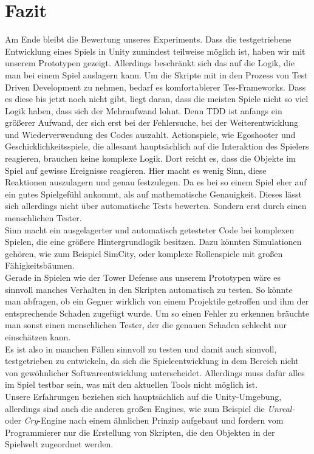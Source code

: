 \chapter{Fazit}
Am Ende bleibt die Bewertung unseres Experiments. Dass die testgetriebene Entwicklung eines Spiels in Unity zumindest teilweise möglich ist, haben wir mit unserem Prototypen gezeigt. Allerdings beschränkt sich das auf die Logik, die man bei einem Spiel auslagern kann. Um die Skripte mit in den Prozess von Test Driven Development zu nehmen, bedarf es komfortablerer Tes-Frameworks. Dass es diese bis jetzt noch nicht gibt, liegt daran, dass die meisten Spiele nicht so viel Logik haben, dass sich der Mehraufwand lohnt. Denn TDD ist anfangs ein größerer Aufwand, der sich erst bei der Fehlersuche, bei der Weiterentwicklung und Wiederverwendung des Codes auszahlt. Actionspiele, wie Egoshooter und Geschicklichkeitsspiele, die allesamt hauptsächlich auf die Interaktion des Spielers reagieren, brauchen keine komplexe Logik. Dort reicht es, dass die Objekte im Spiel auf gewisse Ereignisse reagieren. Hier macht es wenig Sinn, diese Reaktionen auszulagern und genau festzulegen. Da es bei so einem Spiel eher auf ein gutes Spielgefühl ankommt, als auf mathematische Genauigkeit. Dieses lässt sich allerdings nicht über automatische Tests bewerten. Sondern erst durch einen menschlichen Tester.\\
Sinn macht ein ausgelagerter und automatisch getesteter Code bei komplexen Spielen, die eine größere Hintergrundlogik besitzen. Dazu könnten Simulationen gehören, wie zum Beispiel SimCity, oder komplexe Rollenspiele mit großen Fähigkeitsbäumen.\\
Gerade in Spielen wie der Tower Defense aus unserem Prototypen wäre es sinnvoll manches Verhalten in den Skripten automatisch zu testen. So könnte man abfragen, ob ein Gegner wirklich von einem Projektile getroffen und ihm der entsprechende Schaden zugefügt wurde. Um so einen Fehler zu erkennen bräuchte man sonst einen menschlichen Tester, der die genauen Schaden schlecht nur einschätzen kann.\\
Es ist also in manchen Fällen sinnvoll zu testen und damit auch sinnvoll, testgetrieben zu entwickeln, da sich die Spieleentwicklung in dem Bereich nicht von gewöhnlicher Softwareentwicklung unterscheidet. Allerdings muss dafür alles im Spiel testbar sein, was mit den aktuellen Tools nicht möglich ist.\\
Unsere Erfahrungen beziehen sich hauptsächlich auf die Unity-Umgebung, allerdings sind auch die anderen großen Engines, wie zum Beispiel die \textit{Unreal-} oder \textit{Cry}-Engine nach einem ähnlichen Prinzip aufgebaut und fordern vom Programmierer nur die Erstellung von Skripten, die den Objekten in der Spielwelt zugeordnet werden.

